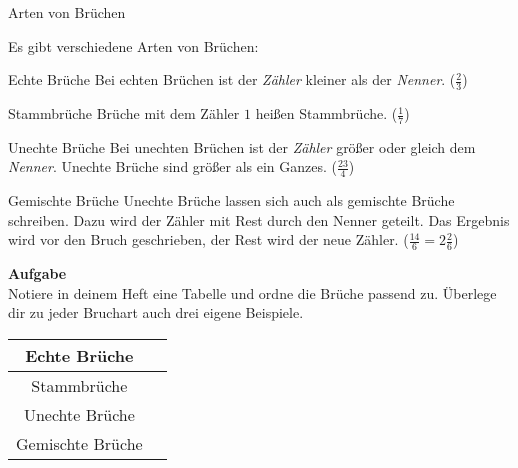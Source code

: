 \documentclass[lerntheke,12pt,a5paper,landscape]{arbeitsblatt}
\begin{document}
	\begin{karte1}{Arten von Brüchen}
		\setlength{\columnseprule}{.5pt}\small
		\begin{multicols}{2}
		Es gibt verschiedene Arten von Brüchen:
		\begin{smalldescr}
			\item[Echte Brüche] Bei echten Brüchen ist der \emph{Zähler} kleiner als der \emph{Nenner}. ($\tfrac{2}{3}$)
			\item[Stammbrüche] Brüche mit dem Zähler $1$ heißen Stammbrüche.
 ($\tfrac{1}{7}$)
 			\item[Unechte Brüche] Bei unechten Brüchen ist der \emph{Zähler} größer oder gleich dem \emph{Nenner}. Unechte Brüche sind größer als ein Ganzes. ($\tfrac{23}{4}$)
			\item[Gemischte Brüche] Unechte Brüche lassen sich auch als gemischte Brüche schreiben. Dazu wird der Zähler mit Rest durch den Nenner geteilt. Das Ergebnis wird vor den Bruch geschrieben, der Rest wird der neue Zähler. ($\tfrac{14}{6} = 2\tfrac{2}{6}$)
		\end{smalldescr}

		\columnbreak
		\textbf{Aufgabe}\\
		Notiere in deinem Heft eine Tabelle und ordne die Brüche passend zu. Überlege dir zu jeder Bruchart auch drei eigene Beispiele.

		\begin{center}\footnotesize
			\begin{tabular}{c|c}\hline
				Echte Brüche & \hspace{2cm} \\\hline
				Stammbrüche & \\\hline
				Unechte Brüche & \\\hline
				Gemischte Brüche & \\\hline
			\end{tabular}

			\normalsize
		\end{center}
		\end{multicols}
	\end{karte1}
\end{document}
